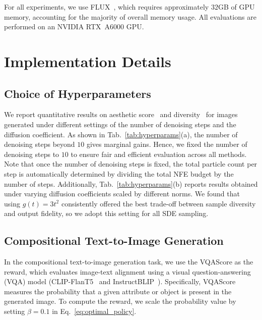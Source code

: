 For all experiments, we use FLUX~\cite{BlackForestLabs:2024Flux}, which requires approximately $32$GB of GPU memory, accounting for the majority of overall memory usage. 
All evaluations are performed on an NVIDIA RTX~A6000 GPU.





\section{Implementation Details}
\label{sec:appendix_impl_details}


\subsection{Choice of Hyperparameters}
We report quantitative results on aesthetic score~\cite{Schuhmann:aesthetics} and diversity~\cite{Kim:2025DAS} for images generated under different settings of the number of denoising steps and the diffusion coefficient. 
% 
As shown in Tab.~\ref{tab:hyperparams}(a), the number of denoising steps beyond $10$ gives marginal gains. 
Hence, we fixed the number of denoising steps to $10$ to ensure fair and efficient evaluation across all methods. Note that once the number of denoising steps is fixed, the total particle count per step is automatically determined by dividing the total NFE budget by the number of steps. 
% 
Additionally, Tab.~\ref{tab:hyperparams}(b) reports results obtained under varying diffusion coefficients scaled by different norms. 
% 
We found that using $g(t) = 3t^2$ consistently offered the best trade-off between sample diversity and output fidelity, so we adopt this setting for all SDE sampling. 


\subsection{Compositional Text-to-Image Generation}
In the compositional text-to-image generation task, we use the VQAScore as the reward, which evaluates image-text alignment using a visual question-answering (VQA) model (CLIP-FlanT5~\cite{Lin:2024CLIPFlanT5} and InstructBLIP~\cite{Dai:2023InstructBLIP}). Specifically, VQAScore measures the probability that a given attribute or object is present in the generated image. To compute the reward, we scale the probability value by setting $\beta=0.1$ in Eq.~\ref{eq:optimal_policy}. 

